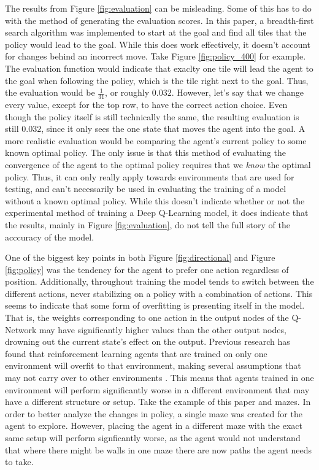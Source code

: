 \documentclass[12pt]{article}
\begin{document}
The results from Figure \ref{fig:evaluation} can be misleading.
Some of this has to do with the method of generating the evaluation scores.
In this paper, a breadth-first search algorithm was implemented to start at the goal and find all tiles that the policy would lead to the goal.
While this does work effectively, it doesn't account for changes behind an incorrect move.
Take Figure \ref{fig:policy_400} for example.
The evaluation function would indicate that exaclty one tile will lead the agent to the goal when following the policy, which is the tile right next to the goal.
Thus, the evaluation would be $\frac{1}{31}$, or roughly $0.032$.
However, let's say that we change every value, except for the top row, to have the correct action choice.
Even though the policy itself is still technically the same, the resulting evaluation is still $0.032$, since it only sees the one state that moves the agent into the goal.
A more realistic evaluation would be comparing the agent's current policy to some known optimal policy.
The only issue is that this method of evaluating the convergence of the agent to the optimal policy requires that we \textit{know} the optimal policy.
Thus, it can only really apply towards environments that are used for testing, and can't necessarily be used in evaluating the training of a model without a known optimal policy.
While this doesn't indicate whether or not the experimental method of training a Deep Q-Learning model, it does indicate that the results, mainly in Figure \ref{fig:evaluation}, do not tell the full story of the acccuracy of the model.

One of the biggest key points in both Figure \ref{fig:directional} and Figure \ref{fig:policy} was the tendency for the agent to prefer one action regardless of position.
Additionally, throughout training the model tends to switch between the different actions, never stabilizing on a policy with a combination of actions.
This seems to indicate that some form of overfitting is presenting itself in the model.
That is, the weights corresponding to one action in the output nodes of the Q-Network may have significantly higher values than the other output nodes, drowning out the current state's effect on the output.
Previous research has found that reinforcement learning agents that are trained on only one environment will overfit to that environment, making several assumptions that may not carry over to other environments \cite{article_overfitting_neural_networks}.
This means that agents trained in one environment will perform significantly worse in a different environment that may have a different structure or setup.
Take the example of this paper and mazes. In order to better analyze the changes in policy, a single maze was created for the agent to explore.
However, placing the agent in a different maze with the exact same setup will perform signficantly worse, as the agent would not understand that where there might be walls in one maze there are now paths the agent needs to take.
\end{document}
